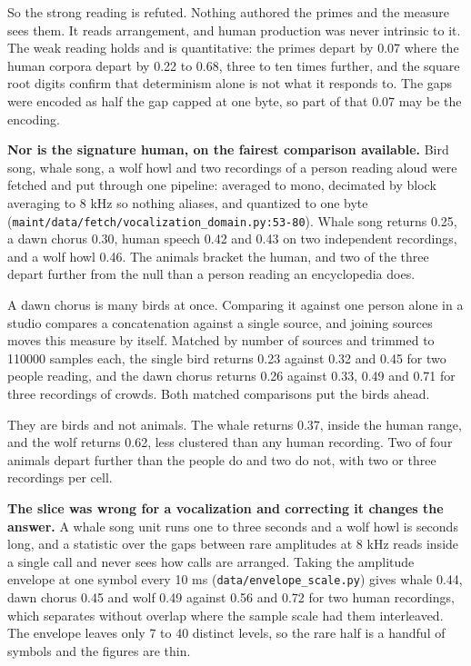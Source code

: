 So the strong reading is refuted. Nothing authored the primes and the measure sees them. It reads arrangement, and human production was never intrinsic to it. The weak reading holds and is quantitative: the primes depart by 0.07 where the human corpora depart by 0.22 to 0.68, three to ten times further, and the square root digits confirm that determinism alone is not what it responds to. The gaps were encoded as half the gap capped at one byte, so part of that 0.07 may be the encoding.

\textbf{Nor is the signature human, on the fairest comparison available.} Bird song, whale song, a wolf howl and two recordings of a person reading aloud were fetched and put through one pipeline: averaged to mono, decimated by block averaging to 8 kHz so nothing aliases, and quantized to one byte (\texttt{maint/\allowbreak{}data/\allowbreak{}fetch/\allowbreak{}vocalization\_\allowbreak{}domain.\allowbreak{}py:53-\allowbreak{}80}). Whale song returns 0.25, a dawn chorus 0.30, human speech 0.42 and 0.43 on two independent recordings, and a wolf howl 0.46. The animals bracket the human, and two of the three depart further from the null than a person reading an encyclopedia does.

A dawn chorus is many birds at once. Comparing it against one person alone in a studio compares a concatenation against a single source, and joining sources moves this measure by itself. Matched by number of sources and trimmed to 110000 samples each, the single bird returns 0.23 against 0.32 and 0.45 for two people reading, and the dawn chorus returns 0.26 against 0.33, 0.49 and 0.71 for three recordings of crowds. Both matched comparisons put the birds ahead.

They are birds and not animals. The whale returns 0.37, inside the human range, and the wolf returns 0.62, less clustered than any human recording. Two of four animals depart further than the people do and two do not, with two or three recordings per cell.

\textbf{The slice was wrong for a vocalization and correcting it changes the answer.} A whale song unit runs one to three seconds and a wolf howl is seconds long, and a statistic over the gaps between rare amplitudes at 8 kHz reads inside a single call and never sees how calls are arranged. Taking the amplitude envelope at one symbol every 10 ms (\texttt{data/\allowbreak{}envelope\_\allowbreak{}scale.\allowbreak{}py}) gives whale 0.44, dawn chorus 0.45 and wolf 0.49 against 0.56 and 0.72 for two human recordings, which separates without overlap where the sample scale had them interleaved. The envelope leaves only 7 to 40 distinct levels, so the rare half is a handful of symbols and the figures are thin.

